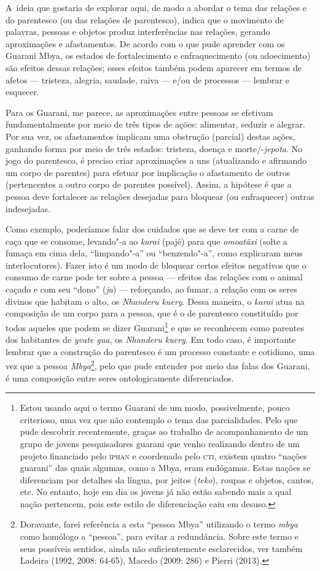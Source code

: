 A~ideia que gostaria de explorar aqui, de modo a abordar o tema das
relações e do parentesco (ou das relações de parentesco), indica que o
movimento de palavras, pessoas e objetos produz interferências nas
relações, gerando aproximações e afastamentos. De acordo com o que pude
aprender com os Guarani Mbya, os estados de fortalecimento e
enfraquecimento (ou adoecimento) são efeitos dessas relações; esses
efeitos também podem aparecer em termos de afetos --- tristeza, alegria,
saudade, raiva --- e/ou de processos --- lembrar e esquecer.

Para os Guarani, me parece, as aproximações entre pessoas se efetivam
fundamentalmente por meio de três tipos de ações: alimentar, seduzir e
alegrar. Por sua vez, os afastamentos implicam uma obstrução (parcial)
destas ações, ganhando forma por meio de três estados: tristeza, doença
e morte/-\emph{jepota}. No jogo do parentesco, é preciso criar aproximações a
uns (atualizando e afirmando um corpo de parentes) para efetuar por
implicação o afastamento de outros (pertencentes a outro corpo de
parentes possível). Assim, a hipótese é que a pessoa deve fortalecer as
relações desejadas para bloquear (ou enfraquecer) outras indesejadas.

Como exemplo, poderíamos falar dos cuidados que se deve ter com a carne
de caça que se consome, levando"-a ao \emph{karai} (pajé) para que \emph{omoatãxi}
(solte a fumaça em cima dela, ``limpando"-a'' ou ``benzendo"-a'', como
explicaram meus interlocutores). Fazer isto é um modo de bloquear
certos efeitos negativos que o consumo de carne pode ter sobre a pessoa
--- efeitos das relações com o animal caçado e com seu ``dono'' (\emph{ja}) ---
reforçando, ao fumar, a relação com os seres divinos que habitam o
alto, os \emph{Nhanderu kuery}. Dessa maneira, o \emph{karai} atua na composição de
um corpo para a pessoa, que é o de parentesco constituído por todos
aqueles que podem se dizer Guarani\footnote{Estou usando aqui o termo
Guarani de um modo, possivelmente, pouco criterioso, uma vez que não
contemplo o tema das parcialidades. Pelo que pude descobrir
recentemente, graças ao trabalho de acompanhamento de um grupo de
jovens pesquisadores guarani que venho realizando dentro de um projeto
financiado pelo \textsc{iphan} e coordenado pelo \textsc{cti}, existem quatro ``nações
guarani'' das quais algumas, como a Mbya, eram endógamas. Estas nações
se diferenciam por detalhes da língua, por jeitos (\emph{teko}), roupas e
objetos, cantos, etc. No entanto, hoje em dia os jovens já não estão
sabendo mais a qual nação pertencem, pois este estilo de diferenciação
caiu em desuso.} e que se reconhecem como parentes dos habitantes de
\emph{yvate gua}, os \emph{Nhanderu kuery}. Em todo caso, é importante lembrar que a
construção do parentesco é um processo constante e cotidiano, uma vez
que a pessoa \emph{Mbya}\footnote{Doravante, farei referência a esta ``pessoa
Mbya'' utilizando o termo \emph{mbya} como homólogo a ``pessoa'', para evitar a
redundância. Sobre este termo e seus possíveis sentidos, ainda não
suficientemente esclarecidos, ver também Ladeira (1992, 2008: 64-65),
Macedo (2009: 286) e Pierri (2013).}, pelo que pude entender por meio
das falas dos Guarani, é uma composição entre seres ontologicamente
diferenciados.

